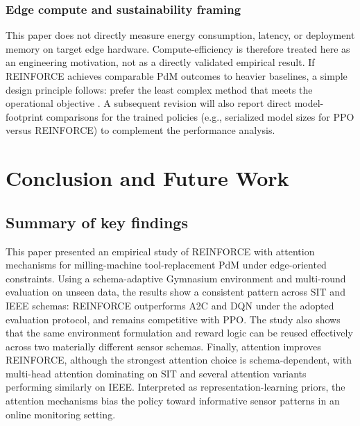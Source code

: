 \documentclass[sn-basic]{sn-jnl} %
\begin{document}
\subsubsection{Edge compute and sustainability framing}
This paper does not directly measure energy consumption, latency, or deployment memory on target edge hardware. Compute-efficiency is therefore treated here as an engineering motivation, not as a directly validated empirical result. If \textsc{REINFORCE} achieves comparable PdM outcomes to heavier baselines, a simple design principle follows: prefer the least complex method that meets the operational objective \cite{Schwartz2020, Strubell2019}. A subsequent revision will also report direct model-footprint comparisons for the trained policies (e.g., serialized model sizes for PPO versus \textsc{REINFORCE}) to complement the performance analysis.

\section{Conclusion and Future Work}
\label{sec:conclusion}
\subsection{Summary of key findings}
This paper presented an empirical study of \textsc{REINFORCE} with attention mechanisms for milling-machine tool-replacement PdM under edge-oriented constraints. Using a schema-adaptive Gymnasium environment and multi-round evaluation on unseen data, the results show a consistent pattern across SIT and IEEE schemas: \textsc{REINFORCE} outperforms \textsc{A2C} and \textsc{DQN} under the adopted evaluation protocol, and remains competitive with \textsc{PPO}. The study also shows that the same environment formulation and reward logic can be reused effectively across two materially different sensor schemas. Finally, attention improves \textsc{REINFORCE}, although the strongest attention choice is schema-dependent, with multi-head attention dominating on SIT and several attention variants performing similarly on IEEE. Interpreted as representation-learning priors, the attention mechanisms bias the policy toward informative sensor patterns in an online monitoring setting.
\end{document}
